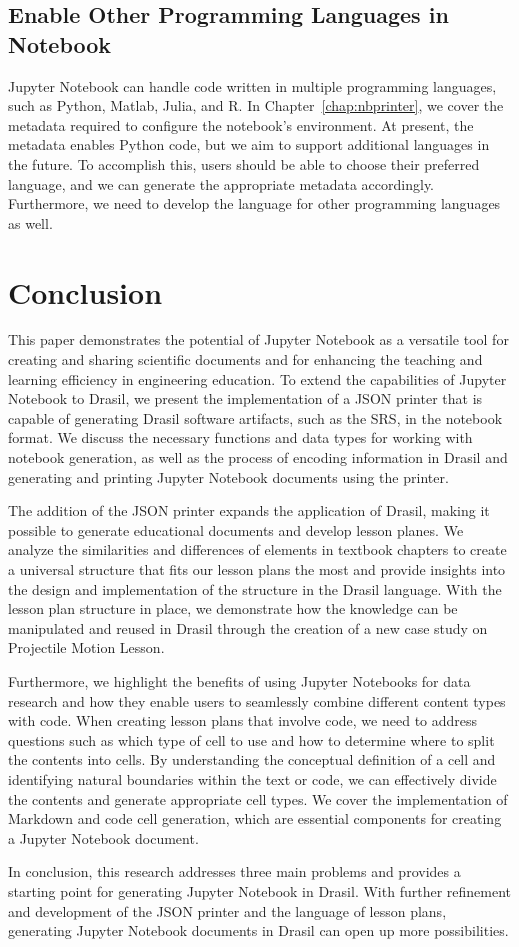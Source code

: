 \subsection{Enable Other Programming Languages in Notebook}
Jupyter Notebook can handle code written in multiple programming languages, 
such as Python, Matlab, Julia, and R. In Chapter~\ref{chap:nbprinter}, we cover 
the metadata required to configure the notebook's environment. At present, the 
metadata enables Python code, but we aim to support additional languages in the 
future. To accomplish this, users should be able to choose their preferred 
language, and we can generate the appropriate metadata accordingly. 
Furthermore, we need to develop the language for other programming languages as 
well.

\section{Conclusion}
This paper demonstrates the potential of Jupyter Notebook as a versatile 
tool for creating and sharing scientific documents and for enhancing the 
teaching and learning efficiency in engineering education. To extend the 
capabilities of Jupyter Notebook to Drasil, we present the implementation of 
a JSON printer that is capable of generating Drasil software artifacts, 
such as the SRS, in the notebook format. We discuss the necessary functions and 
data types for working with notebook generation, as well as the process of 
encoding information in Drasil and generating and printing Jupyter Notebook 
documents using the printer.

The addition of the JSON printer expands the application of Drasil, making it 
possible to generate educational documents and develop lesson planes. We 
analyze the similarities and differences of elements in textbook chapters to 
create a universal structure that fits our lesson plans the most and provide 
insights into the design and implementation of the structure in the Drasil 
language. With the lesson plan structure in place, we demonstrate how the 
knowledge can be manipulated and reused in Drasil through the creation of a new 
case study on Projectile Motion Lesson. 

Furthermore, we highlight the benefits of using Jupyter Notebooks for data 
research and how they enable users to seamlessly combine different content 
types with code. When creating lesson plans that involve code, we need to 
address questions such as which type of cell to use and how to determine where 
to split the contents into cells. By understanding the conceptual definition of 
a cell and identifying natural boundaries within the text or code, we can 
effectively divide the contents and generate appropriate cell types. We cover 
the implementation of Markdown and code cell generation, which are essential 
components for creating a Jupyter Notebook document. 

In conclusion, this research addresses three main problems and provides a 
starting point for generating Jupyter Notebook in Drasil. With further 
refinement and development of the JSON printer and the language of lesson 
plans, generating Jupyter Notebook documents in Drasil can open up more 
possibilities.   